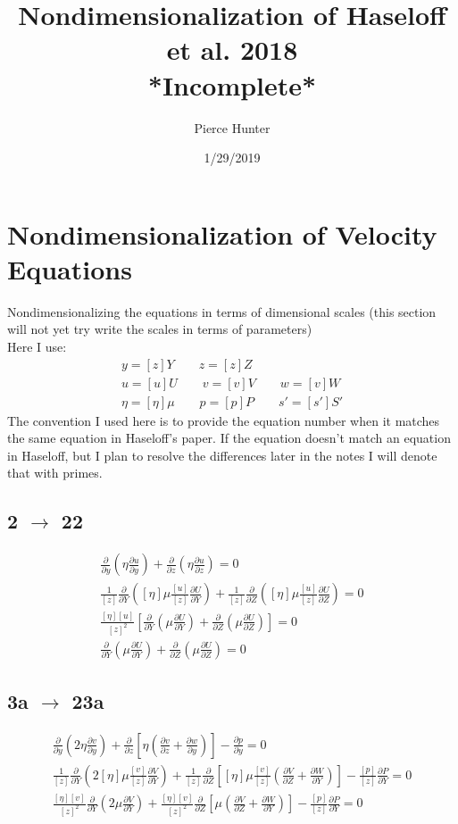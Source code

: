 \documentclass[10pt, letterpaper, twoside]{article}
\title{Nondimensionalization of Haseloff et al. 2018\\{*Incomplete*}}
\author{Pierce Hunter}
\date{1/29/2019}
\newcommand{\pd}[2]{\frac{\partial#1}{\partial#2}}
\begin{document}
	\maketitle
	
	\section{Nondimensionalization of Velocity Equations}
	Nondimensionalizing the equations in terms of dimensional scales (this section will not yet try write the scales in terms of parameters)\\
	Here I use:
	\begin{gather*}
		y = \left[z\right]Y \qquad
		z = \left[z\right]Z\\
		u = \left[u\right]U \qquad
		v = \left[v\right]V \qquad
		w = \left[v\right]W\\
		\eta = \left[\eta\right]\mu \qquad
		p = \left[p\right]P \qquad
		s' = \left[s'\right]S'
	\end{gather*}
	The convention I used here is to provide the equation number when it matches the same equation in Haseloff's paper. If the equation doesn't match an equation in Haseloff, but I plan to resolve the differences later in the notes I will denote that with primes.
	\subsection{2 $ \rightarrow $ 22}
	\begin{gather*}
		\pd{}{y}\left(\eta\pd{u}{y}\right) + \pd{}{z}\left(\eta\pd{u}{z}\right) = 0 \tag{2} \\
		\frac{1}{\left[z\right]}\pd{}{Y}\left(\left[\eta\right]\mu\frac{\left[u\right]}{\left[z\right]}\pd{U}{Y}\right) + \frac{1}{\left[z\right]}\pd{}{Z}\left(\left[\eta\right]\mu\frac{\left[u\right]}{\left[z\right]}\pd{U}{Z}\right) = 0\\
		\frac{\left[\eta\right]\left[u\right]}{\left[z\right]^2}\left[\pd{}{Y}\left(\mu\pd{U}{Y}\right) + \pd{}{Z}\left(\mu\pd{U}{Z}\right)\right] = 0\\
		\pd{}{Y}\left(\mu\pd{U}{Y}\right) + \pd{}{Z}\left(\mu\pd{U}{Z}\right) = 0 \tag{22}
	\end{gather*}
	\subsection{3a $ \rightarrow $ 23a}
	\begin{gather*}
		\pd{}{y}\left(2\eta\pd{v}{y}\right) + \pd{}{z}\left[\eta\left(\pd{v}{z}+\pd{w}{y}\right)\right] - \pd{p}{y} = 0 \tag{3a} \\
		\frac{1}{\left[z\right]}\pd{}{Y}\left(2\left[\eta\right]\mu\frac{\left[v\right]}{\left[z\right]}\pd{V}{Y}\right) + \frac{1}{\left[z\right]}\pd{}{Z}\left[\left[\eta\right]\mu\frac{\left[v\right]}{\left[z\right]}\left(\pd{V}{Z}+\pd{W}{Y}\right)\right] - \frac{\left[p\right]}{\left[z\right]}\pd{P}{Y} = 0\\
		\frac{\left[\eta\right]\left[v\right]}{\left[z\right]^2}\pd{}{Y}\left(2\mu\pd{V}{Y}\right) + \frac{\left[\eta\right]\left[v\right]}{\left[z\right]^2}\pd{}{Z}\left[\mu\left(\pd{V}{Z}+\pd{W}{Y}\right)\right] - \frac{\left[p\right]}{\left[z\right]}\pd{P}{Y} = 0 \tag{3a$'$}
	\end{gather*}
\end{document}
